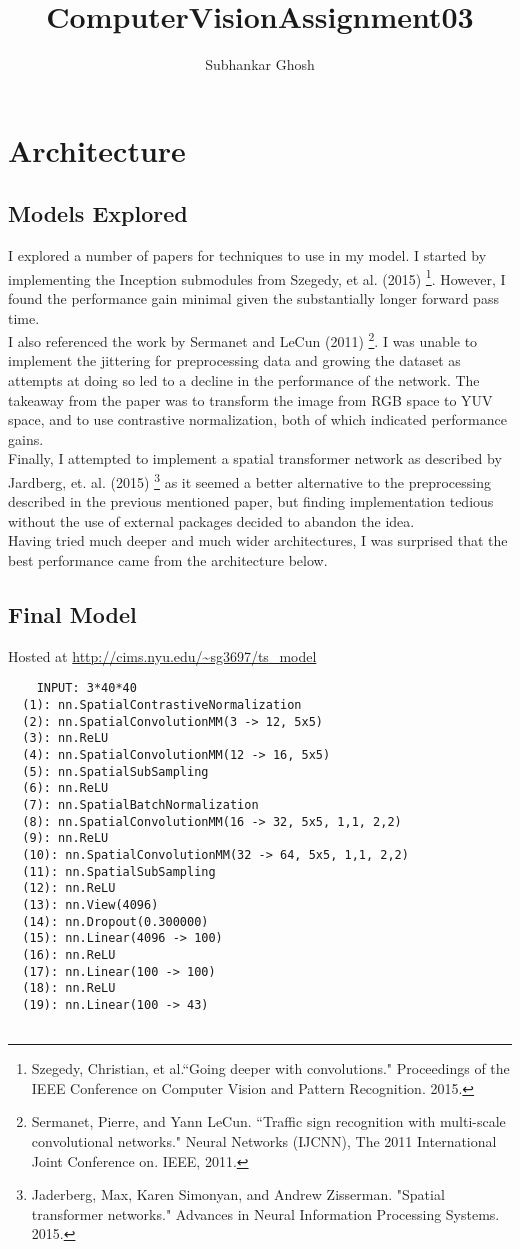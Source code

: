 \documentclass{article}
\title{ComputerVisionAssignment03}
\author{Subhankar Ghosh}
\begin{document}
\section{Architecture}

\subsection{Models Explored}

I explored a number of papers for techniques to use in my model. 
I started by implementing the Inception submodules from Szegedy, et al. (2015) \footnote{Szegedy, Christian, et al.``Going deeper with convolutions." Proceedings of the IEEE Conference on Computer Vision and Pattern Recognition. 2015.}. 
However, I found the performance gain minimal given the substantially longer forward pass time.\\
I also referenced the work by Sermanet and LeCun (2011) \footnote{Sermanet, Pierre, and Yann LeCun. ``Traffic sign recognition with multi-scale convolutional networks." Neural Networks (IJCNN), The 2011 International Joint Conference on. IEEE, 2011.}. 
I was unable to implement the jittering for preprocessing data and growing the dataset as attempts at doing so led to a decline in the performance of the network.
The takeaway from the paper was to transform the image from RGB space to YUV space, and to use contrastive normalization, both of which indicated performance gains.\\
Finally, I attempted to implement a spatial transformer network as described by Jardberg, et. al. (2015) \footnote{Jaderberg, Max, Karen Simonyan, and Andrew Zisserman. "Spatial transformer networks." Advances in Neural Information Processing Systems. 2015.} as it seemed a better alternative to the preprocessing described in the previous mentioned paper, but finding implementation tedious without the use of external packages decided to abandon the idea.\\
Having tried much deeper and much wider architectures, I was surprised that the best performance came from the architecture below.

\subsection{Final Model}
Hosted at \url{http://cims.nyu.edu/~sg3697/ts_model}
\begin{verbatim}
	INPUT: 3*40*40
  (1): nn.SpatialContrastiveNormalization
  (2): nn.SpatialConvolutionMM(3 -> 12, 5x5)
  (3): nn.ReLU
  (4): nn.SpatialConvolutionMM(12 -> 16, 5x5)
  (5): nn.SpatialSubSampling
  (6): nn.ReLU
  (7): nn.SpatialBatchNormalization
  (8): nn.SpatialConvolutionMM(16 -> 32, 5x5, 1,1, 2,2)
  (9): nn.ReLU
  (10): nn.SpatialConvolutionMM(32 -> 64, 5x5, 1,1, 2,2)
  (11): nn.SpatialSubSampling
  (12): nn.ReLU
  (13): nn.View(4096)
  (14): nn.Dropout(0.300000)
  (15): nn.Linear(4096 -> 100)
  (16): nn.ReLU
  (17): nn.Linear(100 -> 100)
  (18): nn.ReLU
  (19): nn.Linear(100 -> 43) 
  
\end{verbatim}
\end{document}
